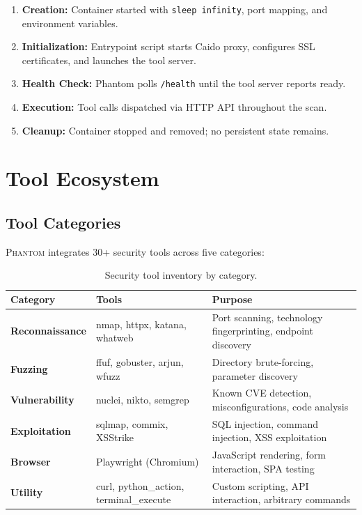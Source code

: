 \documentclass[12pt,a4paper,twoside]{report}
\makeatletter
\newcommand{\phantom@}{\textsc{Phantom}}
\makeatother
\begin{document}
\begin{enumerate}
    \item \textbf{Creation:} Container started with \texttt{sleep infinity}, port mapping, and environment variables.
    \item \textbf{Initialization:} Entrypoint script starts Caido proxy, configures SSL certificates, and launches the tool server.
    \item \textbf{Health Check:} Phantom polls \texttt{/health} until the tool server reports ready.
    \item \textbf{Execution:} Tool calls dispatched via HTTP API throughout the scan.
    \item \textbf{Cleanup:} Container stopped and removed; no persistent state remains.
\end{enumerate}


\chapter{Tool Ecosystem}
\label{ch:tools}

\section{Tool Categories}

\phantom@{} integrates 30+ security tools across five categories:

\begin{table}[H]
\centering
\caption{Security tool inventory by category.}
\label{tab:tools}
\begin{tabularx}{\textwidth}{llX}
\toprule
\textbf{Category} & \textbf{Tools} & \textbf{Purpose} \\
\midrule
\textbf{Reconnaissance} & nmap, httpx, katana, whatweb & Port scanning, technology fingerprinting, endpoint discovery \\
\textbf{Fuzzing}        & ffuf, gobuster, arjun, wfuzz & Directory brute-forcing, parameter discovery \\
\textbf{Vulnerability}  & nuclei, nikto, semgrep & Known CVE detection, misconfigurations, code analysis \\
\textbf{Exploitation}   & sqlmap, commix, XSStrike & SQL injection, command injection, XSS exploitation \\
\textbf{Browser}        & Playwright (Chromium) & JavaScript rendering, form interaction, SPA testing \\
\textbf{Utility}        & curl, python\_action, terminal\_execute & Custom scripting, API interaction, arbitrary commands \\
\bottomrule
\end{tabularx}
\end{table}
\end{document}
